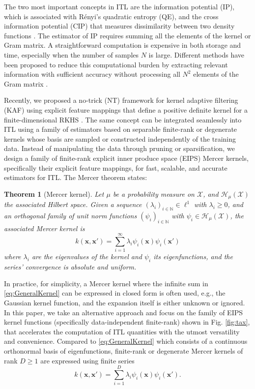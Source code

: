 \documentclass[8pt,twocolumn]{IEEEtran}
\newcommand{\x}{\mathbf{x}}
\newtheorem{thm}{Theorem}  \newtheorem{lem}[thm]{Lemma}        \newtheorem{cor}[thm]{Corollary}
\begin{document}
The two most important concepts in ITL are the information potential (IP), which is associated with R\'{e}nyi's quadratic entropy (QE), and the cross information potential (CIP) that measures dissimilarity between two density functions \cite{Xu08}. The estimator of IP requires summing all the elements of the kernel or Gram matrix. A straightforward computation is expensive in both storage and time, especially when the number of samples $N$ is large. Different methods have been proposed to reduce this computational burden by extracting relevant information with sufficient accuracy without processing all $N^2$ elements of the Gram matrix \cite{SmolaSparseGreedy00, WilliamsIDD2000, Fine02, Seth09}.

Recently, we proposed a no-trick (NT) framework for kernel adaptive filtering (KAF) using explicit feature mappings that define a positive definite kernel for a finite-dimensional RKHS \cite{Li2019notrick}. The same concept can be integrated seamlessly into ITL using a family of estimators based on separable finite-rank or degenerate kernels whose basis are sampled or constructed independently of the training data. Instead of manipulating the data through pruning or sparsification, we design a family of finite-rank explicit inner produce space (EIPS) Mercer kernels, specifically their explicit feature mappings, for fast, scalable, and accurate estimators for ITL. The Mercer theorem states: 
\begin{thm}[Mercer kernel]
	\label{defn:MercerKernel}
	Let $\mu$ be a probability measure on $\mathcal{X}$, and $\mathcal{H}_{\mu}(\mathcal{X})$ the associated Hilbert space. Given a sequence $(\lambda_i)_{i\in\mathbb{N}}\in\ell^1$ with $\lambda_i\geq 0$, and an orthogonal family of unit norm functions $(\psi_i)_{i\in\mathbb{N}}$ with $\psi_i\in\mathcal{H}_{\mu}(\mathcal{X})$, the associated Mercer kernel is
	\begin{equation}
	k(\x,\x')=\sum^\infty_{i=1}\lambda_i\psi_i(\x)\psi_i(\x')\label{eq:GeneralKernel}
	\end{equation}
	where $\lambda_i$ are the eigenvalues of the kernel and $\psi_i$ its eigenfunctions, and the series' convergence is absolute and uniform.
\end{thm}
In practice, for simplicity, a Mercer kernel where the infinite sum in \eqref{eq:GeneralKernel} can be expressed in closed form is often used, e.g., the Gaussian kernel function, and the expansion itself is either unknown or ignored. In this paper, we take an alternative approach and focus on the family of EIPS kernel functions (specifically data-independent finite-rank) shown in Fig. \ref{fig:tax}, that accelerates the computation of ITL quantities with the utmost versatility and convenience. Compared to \eqref{eq:GeneralKernel} which consists of a continuous orthonormal basis of eigenfunctions, finite-rank or degenerate Mercer kernels of rank $D\geq 1$ are expressed using finite series
\begin{equation}
k(\x,\x') =  \sum_{i=1}^{D}\lambda_i \psi_i(\x)\psi_i(\x').
\end{equation}
\end{document}
